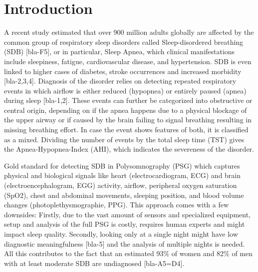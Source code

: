 \chapter{Introduction \label{Chapter-Intro}}

A recent study estimated that over 900 million adults globally are affected
 by the common group of respiratory sleep disorders called Sleep-disordered
 breathing (SDB) [bla-F5], or in particular, Sleep Apnea, which clinical
 manifestations include sleepiness, fatigue, cardiovascular disease, and
 hypertension. SDB is even linked to higher cases of diabetes, stroke
 occurrences and increased morbidity [bla-2,3,4].
Diagnosis of the disorder relies on detecting repeated respiratory events
 in which airflow is either reduced (hypopnea) or entirely paused (apnea)
 during sleep [bla-1,2]. These events can further be categorized into
 obstructive or central origin, depending on if the apnea happens due to
 a physical blockage of the upper airway or if caused by the brain failing
 to signal breathing resulting in missing breathing effort. In case the
 event shows features of both, it is classified as a mixed.
Dividing the number of events by the total sleep time (TST) gives the
 Apnea-Hypopnea-Index (AHI), which indicates the severeness of the disorder.

Gold standard for detecting SDB in Polysomnography (PSG) which captures
 physical and biological signals like heart (electrocardiogram, ECG) and
 brain (electroencephalogram, EGG) activity, airflow, peripheral oxygen
 saturation (SpO2), chest and abdominal movements, sleeping position, and
 blood volume changes (photoplethysmographie, PPG).
This approach comes with a few downsides: Firstly, due to the vast amount
 of sensors and specialized equipment, setup and analysis of the full PSG
 is costly, requires human experts and might impact sleep quality.
 Secondly, looking only at a single night might have low diagnostic
 meaningfulness [bla-5] and the analysis of multiple nights is needed. All
 this contributes to the fact that an estimated 93\% of women and 82\%
 of men with at least moderate SDB are undiagnosed [bla-A5=D4].

